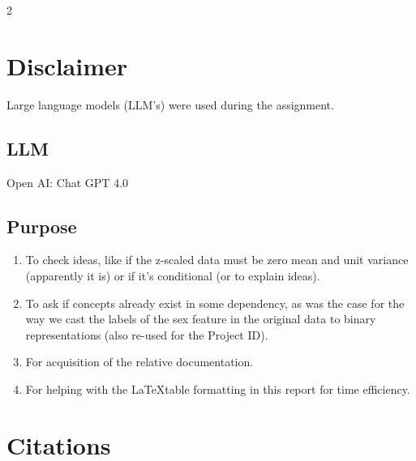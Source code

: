 \documentclass[12pt, a4paper]{article}
\begin{document}
\begin{multicols}{2}
    \section{Disclaimer} \label{sec:disc}

    Large language models (LLM's) were used during the assignment.

    \subsection{LLM} \label{subsec:llms}

    Open AI: Chat GPT 4.0 \cite{noauthor_chatgpt_nodate}

    \subsection{Purpose} \label{subsec:llmUse}

    \begin{enumerate} \label{enm:llm}
        \item To check ideas, like if the z-scaled data must be zero mean and unit variance (apparently it is) or if it's conditional (or to explain ideas).
        \item To ask if concepts already exist in some dependency, as was the case for the way we cast the labels of the sex feature in the original data to binary representations (also re-used for the Project ID).
        \item For acquisition of the relative documentation.
        \item For helping with the \LaTeX table formatting in this report for time efficiency.
    \end{enumerate}

    \section{Citations} \label{sec:citations}

    \printbibliography

\end{multicols}
\end{document}
